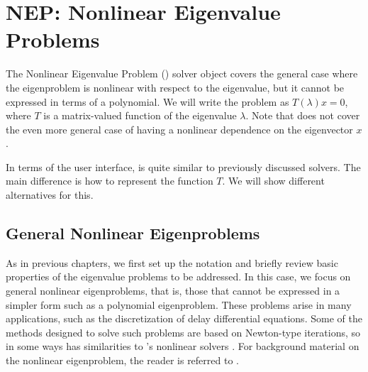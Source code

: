 \chapter{\label{cap:nep}NEP: Nonlinear Eigenvalue Problems}

\begin{center}
  {\setlength{\fboxsep}{4mm}
  }
\end{center}

\noindent The Nonlinear Eigenvalue Problem () solver object covers the general case where the eigenproblem is nonlinear with respect to the eigenvalue, but it cannot be expressed in terms of a polynomial. We will write the problem as $T(\lambda)x=0$, where $T$ is a matrix-valued function of the eigenvalue $\lambda$. Note that  does not cover the even more general case of having a nonlinear dependence on the eigenvector $x$.

In terms of the user interface,  is quite similar to previously discussed solvers. The main difference is how to represent the function $T$. We will show different alternatives for this.

\section{\label{sec:nep}General Nonlinear Eigenproblems}

As in previous chapters, we first set up the notation and briefly review basic properties of the eigenvalue problems to be addressed. In this case, we focus on general nonlinear eigenproblems, that is, those that cannot be expressed in a simpler form such as a polynomial eigenproblem. These problems arise in many applications, such as the discretization of delay differential equations. Some of the methods designed to solve such problems are based on Newton-type iterations, so in some ways  has similarities to \petsc's nonlinear solvers . For background material on the nonlinear eigenproblem, the reader is referred to \citep{Mehrmann:2004:NEP}.

